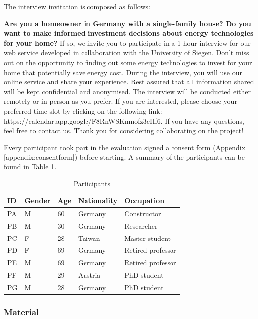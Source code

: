 The interview invitation is composed as follows:

\textbf{Are you a homeowner in Germany with a single-family house? 
Do you want to make informed investment decisions about energy technologies for your home? }
If so, we invite you to participate in a 1-hour interview for our web service developed in collaboration with the University of Siegen.
Don't miss out on the opportunity to finding out some energy technologies to invest for your home that potentially save energy cost. 
During the interview, you will use our online service and share your experience.
Rest assured that all information shared will be kept confidential and anonymised. 
The interview will be conducted either remotely or in person as you prefer. 
If you are interested, please choose your preferred time slot by clicking on the following link: https://calendar.app.google/F8RnWSKmnofz3cHf6. 
If you have any questions, feel free to contact us.
Thank you for considering collaborating on the project! 

Every participant took part in the evaluation signed a consent form (Appendix \ref{appendix:consentform}) before starting. 
A summary of the participants can be found in Table \ref{tab:participants}.
\begin{table}[h!]
  \centering
  \begin{tabular}{ | p{} | p{} | p{} | p{} | p{} | } 
    \hline
    ID & Gender & Age & Nationality & Occupation \\
    \hline
    PA & M & 60 & Germany & Constructor \\
    \hline
    PB & M & 30 & Germany & Researcher \\
    \hline
    PC & F & 28 & Taiwan & Master student \\
    \hline
    PD & F & 69 & Germany & Retired professor \\
    \hline
    PE & M & 69 & Germany & Retired professor \\
    \hline
    PF & M & 29 & Austria & PhD student \\
    \hline
    PG & M & 28 & Germany & PhD student \\
    \hline
  \end{tabular}
  \caption{Participants}
  \label{tab:participants}
\end{table}


\subsubsection{Material}


